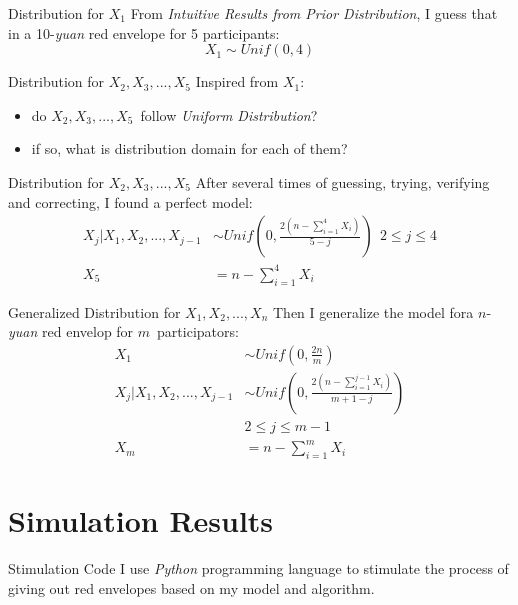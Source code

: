 \documentclass[12pt]{beamer}
\begin{document}
\begin{frame}{Distribution for \(X_1\)}
	From \emph{Intuitive Results from Prior Distribution}, I guess that in a 10-\emph{yuan} red envelope for 5 participants:
	\begin{displaymath}
		X_1\sim Unif(0,4)
	\end{displaymath}
\end{frame}

\begin{frame}{Distribution for \(X_2,X_3,...,X_5\)}
	Inspired from \(X_1\):
	\begin{itemize}
		\item do \(X_2,X_3,...,X_5\)\ follow \emph{Uniform Distribution}?
		\item if so, what is distribution domain for each of them?
	\end{itemize}
\end{frame}

\begin{frame}{Distribution for \(X_2,X_3,...,X_5\)}
	After several times of guessing, trying, verifying and correcting, I found a perfect model:
	\[
		\begin{split}
			X_j|X_1,X_2,...,X_{j-1}&\sim Unif(0,\frac{2(n-\sum_{i=1}^{4}X_i)}{5-j})\ \ 2\leq j\leq 4
			\\
			X_5&=n-\sum_{i=1}^{4}X_i
		\end{split}
	\]
\end{frame}

\begin{frame}{Generalized Distribution for \(X_1,X_2,...,X_n\)}
	Then I generalize the model fora \(n\)-\emph{yuan} red envelop for \(m\)\ participators:
	\[
		\begin{split}
			X_1&\sim Unif(0,\frac{2n}{m})
			\\
			X_j|X_1,X_2,...,X_{j-1}&\sim Unif(0,\frac{2(n-\sum_{i=1}^{j-1}X_i)}{m+1-j})
			\\
			&2\leq j\leq m-1
			\\
			X_m&=n-\sum_{i=1}^{m}X_i
		\end{split}
	\]	
\end{frame}

\section{Simulation Results}
\begin{frame}{Stimulation Code}
	I use \emph{Python} programming language to stimulate the process of giving out red envelopes based on my model and algorithm.
\end{frame}
\end{document}
